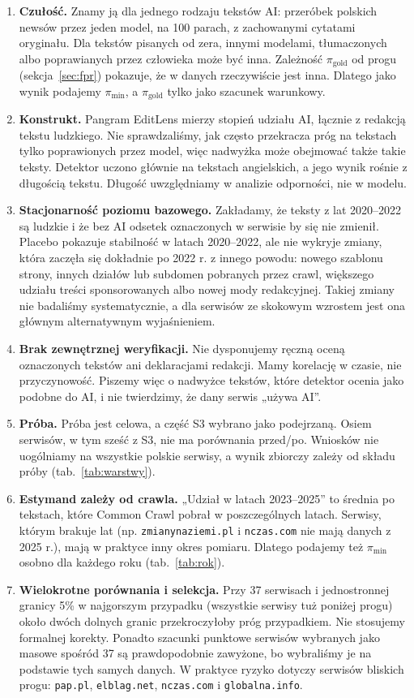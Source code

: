 \documentclass[11pt,a4paper]{article}
\newcommand{\pimin}{\ensuremath{\pi_{\mathrm{min}}}}
\newcommand{\pigold}{\ensuremath{\pi_{\mathrm{gold}}}}
\newcommand{\dom}[1]{\texttt{#1}}
\begin{document}
\begin{enumerate}
\item \textbf{Czułość.} Znamy ją dla jednego rodzaju tekstów AI: przeróbek polskich newsów przez jeden model, na 100 parach, z zachowanymi cytatami oryginału. Dla tekstów pisanych od zera, innymi modelami, tłumaczonych albo poprawianych przez człowieka może być inna. Zależność \pigold{} od progu (sekcja~\ref{sec:fpr}) pokazuje, że w danych rzeczywiście jest inna. Dlatego jako wynik podajemy \pimin{}, a \pigold{} tylko jako szacunek warunkowy.
\item \textbf{Konstrukt.} Pangram EditLens mierzy stopień udziału AI, łącznie z redakcją tekstu ludzkiego. Nie sprawdzaliśmy, jak często przekracza próg na tekstach tylko poprawionych przez model, więc nadwyżka może obejmować także takie teksty. Detektor uczono głównie na tekstach angielskich, a jego wynik rośnie z długością tekstu. Długość uwzględniamy w analizie odporności, nie w modelu.
\item \textbf{Stacjonarność poziomu bazowego.} Zakładamy, że teksty z lat 2020--2022 są ludzkie i że bez AI odsetek oznaczonych w serwisie by się nie zmienił. Placebo pokazuje stabilność w latach 2020--2022, ale nie wykryje zmiany, która zaczęła się dokładnie po 2022 r. z innego powodu: nowego szablonu strony, innych działów lub subdomen pobranych przez crawl, większego udziału treści sponsorowanych albo nowej mody redakcyjnej. Takiej zmiany nie badaliśmy systematycznie, a dla serwisów ze skokowym wzrostem jest ona głównym alternatywnym wyjaśnieniem.
\item \textbf{Brak zewnętrznej weryfikacji.} Nie dysponujemy ręczną oceną oznaczonych tekstów ani deklaracjami redakcji. Mamy korelację w czasie, nie przyczynowość. Piszemy więc o nadwyżce tekstów, które detektor ocenia jako podobne do AI, i nie twierdzimy, że dany serwis „używa AI”.
\item \textbf{Próba.} Próba jest celowa, a część S3 wybrano jako podejrzaną. Osiem serwisów, w tym sześć z S3, nie ma porównania przed/po. Wniosków nie uogólniamy na wszystkie polskie serwisy, a wynik zbiorczy zależy od składu próby (tab.~\ref{tab:warstwy}).
\item \textbf{Estymand zależy od crawla.} „Udział w latach 2023--2025” to średnia po tekstach, które Common Crawl pobrał w poszczególnych latach. Serwisy, którym brakuje lat (np. \dom{zmianynaziemi.pl} i \dom{nczas.com} nie mają danych z 2025 r.), mają w praktyce inny okres pomiaru. Dlatego podajemy też \pimin{} osobno dla każdego roku (tab.~\ref{tab:rok}).
\item \textbf{Wielokrotne porównania i selekcja.} Przy 37 serwisach i jednostronnej granicy 5\% w najgorszym przypadku (wszystkie serwisy tuż poniżej progu) około dwóch dolnych granic przekroczyłoby próg przypadkiem. Nie stosujemy formalnej korekty. Ponadto szacunki punktowe serwisów wybranych jako masowe spośród 37 są prawdopodobnie zawyżone, bo wybraliśmy je na podstawie tych samych danych. W praktyce ryzyko dotyczy serwisów bliskich progu: \dom{pap.pl}, \dom{elblag.net}, \dom{nczas.com} i \dom{globalna.info}.

\end{enumerate}
\end{document}
